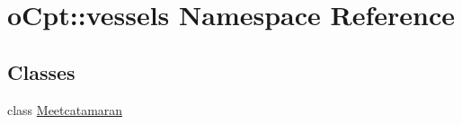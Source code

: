 \hypertarget{namespaceo_cpt_1_1vessels}{}\section{o\+Cpt\+:\+:vessels Namespace Reference}
\label{namespaceo_cpt_1_1vessels}
\subsection*{Classes}
\begin{DoxyCompactItemize}
\item 
class \hyperlink{classo_cpt_1_1vessels_1_1_meetcatamaran}{Meetcatamaran}
\end{DoxyCompactItemize}

